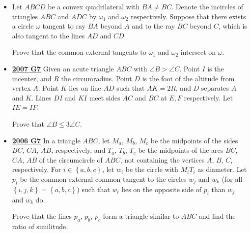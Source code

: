 \documentclass[11pt]{scrartcl}
\begin{document}
\begin{itemize}[leftmargin=*]
Prove that $ABC$ is equilateral too.




\item {}  Let $ ABCD$ be a convex quadrilateral with $ BA\neq BC$. Denote the incircles of triangles $ ABC$ and $ ADC$ by $ \omega_{1}$ and $ \omega_{2}$ respectively. Suppose that there exists a circle $ \omega$ tangent to ray $ BA$ beyond $ A$ and to the ray $ BC$ beyond $ C$, which is also tangent to the lines $ AD$ and $ CD$. 

Prove that the common external tangents to $ \omega_{1}$ and $\omega_{2}$ intersect on $ \omega$.


\item \href{https://artofproblemsolving.com/community/c6h213519p1178972}{\textbf{2007 G7}} Given an acute triangle $ ABC$ with $ \angle B > \angle C$. Point $ I$ is the incenter, and $ R$ the circumradius. Point $ D$ is the foot of the altitude from vertex $ A$. Point $ K$ lies on line $ AD$ such that $ AK = 2R$, and $ D$ separates $ A$ and $ K$. Lines $ DI$ and $ KI$ meet sides $ AC$ and $ BC$ at $ E,F$ respectively. Let $ IE = IF$. 

Prove that $ \angle B\leqslant 3\angle C$.
\item \href{https://artofproblemsolving.com/community/c6h155711p875028}{\textbf{2006 G7}} 	In a triangle $ ABC$, let $ M_{a}$, $ M_{b}$, $ M_{c}$ be the midpoints of the sides $ BC$, $ CA$, $ AB$, respectively, and $ T_{a}$, $ T_{b}$, $ T_{c}$ be the midpoints of the arcs $ BC$, $ CA$, $ AB$ of the circumcircle of $ ABC$, not containing the vertices $ A$, $ B$, $ C$, respectively. For $ i \in \left\{a, b, c\right\}$, let $ w_{i}$ be the circle with $ M_{i}T_{i}$ as diameter. Let $ p_{i}$ be the common external common tangent to the circles $ w_{j}$ and $ w_{k}$ (for all $ \left\{i, j, k\right\}= \left\{a, b, c\right\}$) such that $ w_{i}$ lies on the opposite side of $ p_{i}$ than $ w_{j}$ and $ w_{k}$ do.

Prove that the lines $ p_{a}$, $ p_{b}$, $ p_{c}$ form a triangle similar to $ ABC$ and find the ratio of similitude.
\end{itemize}
\newpage
\end{document}

